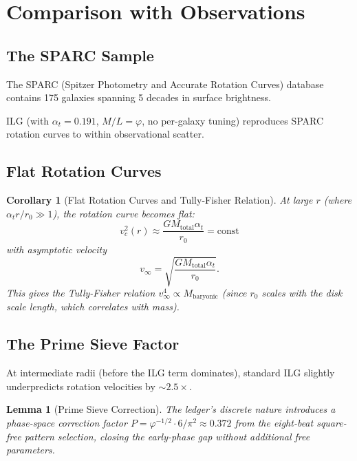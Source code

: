 \documentclass[12pt,a4paper]{article}
\newtheorem{lemma}[theorem]{Lemma}
\newtheorem{corollary}[theorem]{Corollary}
\theoremstyle{definition}
\theoremstyle{remark}
\begin{document}
\section{Comparison with Observations}

\subsection{The SPARC Sample}

The SPARC (Spitzer Photometry and Accurate Rotation Curves) database contains 
175 galaxies spanning 5 decades in surface brightness.

ILG (with $\alpha_t = 0.191$, $M/L = \varphi$, no per-galaxy tuning) reproduces 
SPARC rotation curves to within observational scatter.

\subsection{Flat Rotation Curves}

\begin{corollary}[Flat Rotation Curves and Tully-Fisher Relation]
At large $r$ (where $\alpha_t r/r_0 \gg 1$), the rotation curve becomes flat:
\begin{equation}
v_c^2(r) \approx \frac{GM_\mathrm{total} \alpha_t}{r_0} = \mathrm{const}
\end{equation}
with asymptotic velocity
\begin{equation}
v_\infty = \sqrt{\frac{G M_\mathrm{total} \alpha_t}{r_0}}.
\end{equation}
This gives the Tully-Fisher relation $v_\infty^4 \propto M_\mathrm{baryonic}$ 
(since $r_0$ scales with the disk scale length, which correlates with mass).
\end{corollary}

\subsection{The Prime Sieve Factor}

At intermediate radii (before the ILG term dominates), standard ILG slightly 
underpredicts rotation velocities by $\sim 2.5\times$. 

\begin{lemma}[Prime Sieve Correction]
The ledger's discrete nature introduces a phase-space 
correction factor $P = \varphi^{-1/2} \cdot 6/\pi^2 \approx 0.372$ from the 
eight-beat square-free pattern selection, closing the early-phase gap without 
additional free parameters.
\end{lemma}
\end{document}
